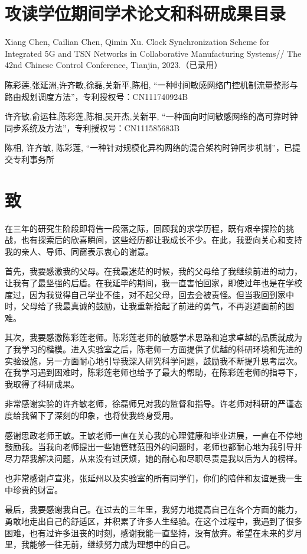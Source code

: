 \documentclass[UTF8,a4paper,12pt]{ctexart}
\numberwithin{equation}{section}
\begin{document}
\newpage
{}

\section*{攻读学位期间学术论文和科研成果目录}
\noindent
[1] Xiang Chen, Cailian Chen, Qimin Xu. Clock Synchronization Scheme for Integrated 5G and TSN Networks in Collaborative Manufacturing Systems//
The 42nd Chinese Control Conference, Tianjin, 2023.（已录用）

\noindent
[2]陈彩莲,张延洲,许齐敏,徐磊,关新平,陈相, “一种时间敏感网络门控机制流量整形与路由规划调度方法”，专利授权号：CN111740924B

\noindent
[3]许齐敏,俞运柱,陈彩莲,陈相,吴开杰,关新平, “一种面向时间敏感网络的高可靠时钟同步系统及方法”，专利授权号：CN111585683B

\noindent
[4]陈相, 许齐敏, 陈彩莲, “一种针对规模化异构网络的混合架构时钟同步机制”，已提交专利事务所

\newpage
{}

\section*{致}
\hspace{8mm}

在三年的研究生阶段即将告一段落之际，回顾我的求学历程，既有艰辛探险的挑战，也有探索后的欣喜瞬间，这些经历都让我成长不少。在此，我要向关心和支持我的亲人、导师、同窗表示衷心的谢意。

首先，我要感激我的父母。在我最迷茫的时候，我的父母给了我继续前进的动力，让我有了最坚强的后盾。在我延毕的期间，我一直害怕回家，即使过年也是在学校度过，因为我觉得自己学业不佳，对不起父母，回去会被责怪。但当我回到家中时，父母给了我最真诚的鼓励，让我重新拾起了前进的勇气，不再逃避面前的困难。

其次，我要感激陈彩莲老师。陈彩莲老师的敏感学术思路和追求卓越的品质就成为了我学习的楷模。进入实验室之后，陈老师一方面提供了优越的科研环境和先进的实验设施，另一方面耐心地引导我深入研究科学问题，鼓励我不断提升思考层次。在我学习遇到困难时，陈彩莲老师也给予了最大的帮助，在陈彩莲老师的指导下，我取得了科研成果。

非常感谢实验的许齐敏老师，徐磊师兄对我的监督和指导。许老师对科研的严谨态度给我留下了深刻的印象，也将使我终身受用。

感谢思政老师王敏。王敏老师一直在关心我的心理健康和毕业进展，一直在不停地鼓励我。当我向老师提出一些她管辖范围外的问题时，老师也都耐心地为我引导并尽力帮我解决问题，从来没有过厌烦，她的耐心和尽职尽责是我以后为人的榜样。

也非常感谢卢宣兆，张延州以及实验室的所有同学们，你们的陪伴和友谊是我一生中珍贵的财富。

最后，我要感谢我自己。在过去的三年里，我努力地提高自己在各个方面的能力，勇敢地走出自己的舒适区，并积累了许多人生经验。在这个过程中，我遇到了很多困难，也有过许多沮丧的时刻，感谢我能一直坚持，没有放弃。希望在未来的岁月里，我能够一往无前，继续努力成为理想中的自己。
\end{document}
